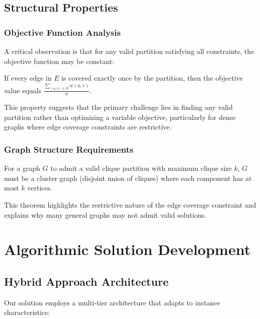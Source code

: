 \documentclass[12pt,a4paper]{article}
\begin{document}
\subsection{Structural Properties}

\subsubsection{Objective Function Analysis}

A critical observation is that for any valid partition satisfying all constraints, the objective function may be constant:

\begin{lemma}
If every edge in $E$ is covered exactly once by the partition, then the objective value equals $\frac{\sum_{(u,v) \in E} w(u,v)}{n}$.
\end{lemma}

This property suggests that the primary challenge lies in finding any valid partition rather than optimizing a variable objective, particularly for dense graphs where edge coverage constraints are restrictive.

\subsubsection{Graph Structure Requirements}

\begin{theorem}
For a graph $G$ to admit a valid clique partition with maximum clique size $k$, $G$ must be a cluster graph (disjoint union of cliques) where each component has at most $k$ vertices.
\end{theorem}

This theorem highlights the restrictive nature of the edge coverage constraint and explains why many general graphs may not admit valid solutions.

\section{Algorithmic Solution Development}

\subsection{Hybrid Approach Architecture}

Our solution employs a multi-tier architecture that adapts to instance characteristics:
\end{document}
